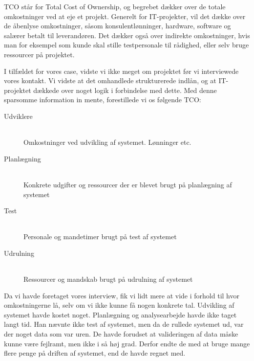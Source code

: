TCO står for Total Cost of Ownership, og begrebet dækker over de totale
omkostninger ved at eje et projekt. Generelt for IT-projekter, vil det dække
over de åbenlyse omkostninger, såsom konsulentlønninger, hardware, software og
salærer betalt til leverandøren. Det dækker også over indirekte omkostninger,
hvis man for eksempel som kunde skal stille testpersonale til rådighed, eller
selv bruge ressourcer på projektet.

I tilfældet for vores case, vidste vi ikke meget om projektet før vi
interviewede vores kontakt. Vi vidste at det omhandlede strukturerede indlån, og
at IT-projektet dækkede over noget logik i forbindelse med dette. Med denne
sparsomme information in mente, forestillede vi os følgende TCO:

\begin{description}
  \item[Udviklere]\hfill
  \\
  Omkostninger ved udvikling af systemet. Lønninger etc.
  \item[Planlægning] \hfill
  \\
  Konkrete udgifter og ressourcer der er blevet brugt på planlægning af systemet
  \item[Test]\hfill
  \\
  Personale og mandetimer brugt på test af systemet
  \item[Udrulning]\hfill
  \\
  Ressourcer og mandskab brugt på udrulning af systemet
\end{description}

Da vi havde foretaget vores interview, fik vi lidt mere at vide i forhold til
hvor omkostningerne lå, selv om vi ikke kunne få nogen konkrete tal. Udvikling
af systemet havde kostet noget. Planlægning og analysearbejde havde ikke taget
langt tid. Han nævnte ikke test af systemet, men da de rullede systemet ud, var
der noget data som var uren. De havde forudset at valideringen af data måske
kunne være fejlramt, men ikke i så høj grad. Derfor endte de med at bruge mange
flere penge på driften af systemet, end de havde regnet med.
